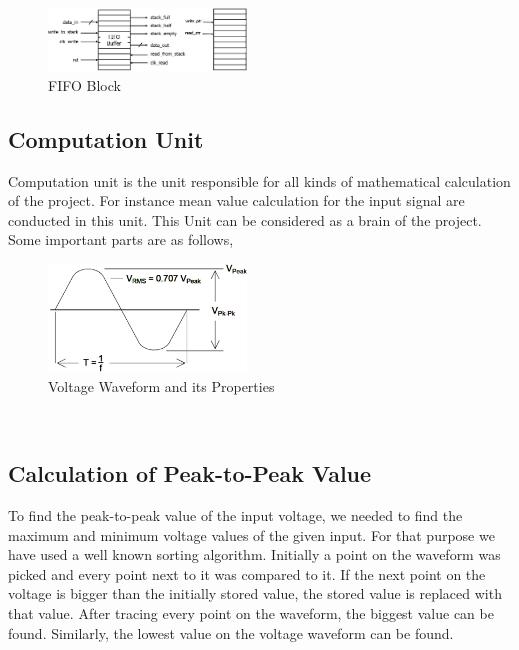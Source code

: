 \documentclass[paper]{IEEEtran}
\begin{document}
\begin{figure}[h!]
	\setlength{\unitlength}{\textwidth}
	\center 
	\includegraphics[width=0.47\textwidth]{fifo_ports}
	\caption{\label{fig:fifo_ports} FIFO Block}
\end{figure}
		
		
\subsection{Computation Unit} \- \indent
	Computation unit is the unit responsible for all kinds of mathematical calculation of the project. For instance mean value calculation for the input signal are conducted in this unit. This Unit can be considered as a brain of the project. Some important parts are as follows,	

\begin{figure}[h!]
	\setlength{\unitlength}{\textwidth}
	\center 
	\includegraphics[width=0.47\textwidth]{voltage}
	\caption{\label{fig:waveform} Voltage Waveform and its Properties}
\end{figure}

\- \\[4cm]

\subsection{Calculation of Peak-to-Peak Value }	
\- \indent
	To find the peak-to-peak value of the input voltage, we needed to find the maximum and minimum voltage values of the given input. For that purpose we have used a well known sorting algorithm. Initially a point on the waveform was picked and every point next to it was compared to it. If the next point on the voltage is bigger than the initially stored value, the stored value is replaced with that value. After tracing every point on the waveform, the biggest value can be found. Similarly, the lowest value on the voltage waveform can be found. 
	
\end{document}
